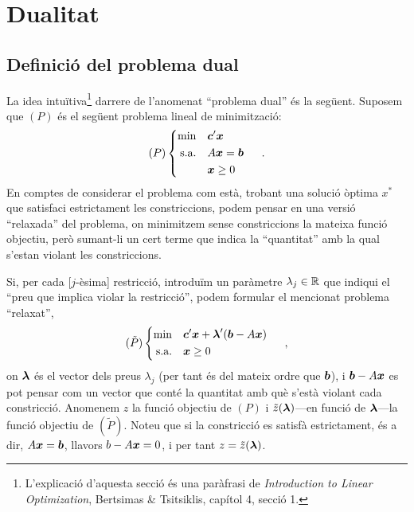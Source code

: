 \chapter{Dualitat}

\section{Definició del problema dual}

La idea intuïtiva\footnote{L'explicació d'aquesta secció és una paràfrasi de \textit{Introduction to Linear Optimization}, Bertsimas \& Tsitsiklis, capítol 4, secció 1.} darrere de l'anomenat ``problema dual'' és la següent. Suposem que $(P)$ és el següent problema lineal de minimització:
\[
	(P)
	\begin{cases}
	\begin{aligned}
	\min 			&&& \boldsymbol{c}'\boldsymbol{x}\\
	\text{s.a.}		&&& A\boldsymbol{x} = \boldsymbol{b}\\
	&&& \boldsymbol{x}\ge0
	\end{aligned}
	\end{cases}\ .
\]
En comptes de considerar el problema com està, trobant una solució òptima $x^\ast$ que satisfaci estrictament les constriccions, podem pensar en una versió ``relaxada'' del problema, on minimitzem sense constriccions la mateixa funció objectiu, però sumant-li un cert terme que indica la ``quantitat'' amb la qual s'estan violant les constriccions. 

Si, per cada [$j$-èsima] restricció, introduïm un paràmetre $\lambda_j\in\mathbb{R}$ que indiqui el ``preu que implica violar la restricció'', podem formular el mencionat problema ``relaxat'',
\[
	(\tilde{P})
	\begin{cases}
	\begin{aligned}
	\min 			&&& \boldsymbol{c}'\boldsymbol{x} + \boldsymbol{\lambda}'(\boldsymbol{b}-A\boldsymbol{x})\\
	\text{s.a.}		&&& \boldsymbol{x} \ge 0\\
	\end{aligned}
	\end{cases}\ ,
\]
on $\boldsymbol{\lambda}$ és el vector dels preus $\lambda_j$ (per tant és del mateix ordre que $\boldsymbol{b}$), i $\boldsymbol{b}-A\boldsymbol{x}$ es pot pensar com un vector que conté la quantitat amb què s'està violant cada constricció. Anomenem $z$ la funció objectiu de $(P)$ i $\tilde{z}(\boldsymbol{\lambda})$---en funció de $\boldsymbol{\lambda}$---la funció objectiu de $(\tilde{P})$. Noteu que si la constricció es satisfà estrictament, és a dir, $A\boldsymbol{x}=\boldsymbol{b}$, llavors $b-A\boldsymbol{x} = 0$, i per tant $z = \tilde{z}(\boldsymbol{\lambda})$.

